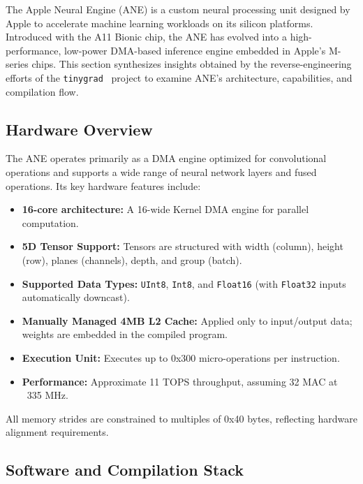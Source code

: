 The Apple Neural Engine (ANE) is a custom neural processing unit designed by Apple to accelerate machine learning workloads on its silicon platforms. Introduced with the A11 Bionic chip, the ANE has evolved into a high-performance, low-power DMA-based inference engine embedded in Apple's M-series chips. This section synthesizes insights obtained by the reverse-engineering efforts of the \texttt{tinygrad}~\cite{tinygrad2023ane} project to examine ANE's architecture, capabilities, and compilation flow.

\subsection{Hardware Overview}

The ANE operates primarily as a DMA engine optimized for convolutional operations and supports a wide range of neural network layers and fused operations. Its key hardware features include:

\begin{itemize}
  \item \textbf{16-core architecture:} A 16-wide Kernel DMA engine for parallel computation.
  \item \textbf{5D Tensor Support:} Tensors are structured with width (column), height (row), planes (channels), depth, and group (batch).
  \item \textbf{Supported Data Types:} \texttt{UInt8}, \texttt{Int8}, and \texttt{Float16} (with \texttt{Float32} inputs automatically downcast).
  \item \textbf{Manually Managed 4MB L2 Cache:} Applied only to input/output data; weights are embedded in the compiled program.
  \item \textbf{Execution Unit:} Executes up to 0x300 micro-operations per instruction.
  \item \textbf{Performance:} Approximate 11 TOPS throughput, assuming 32 MAC at ~335 MHz.
\end{itemize}

All memory strides are constrained to multiples of 0x40 bytes, reflecting hardware alignment requirements.

\subsection{Software and Compilation Stack}

